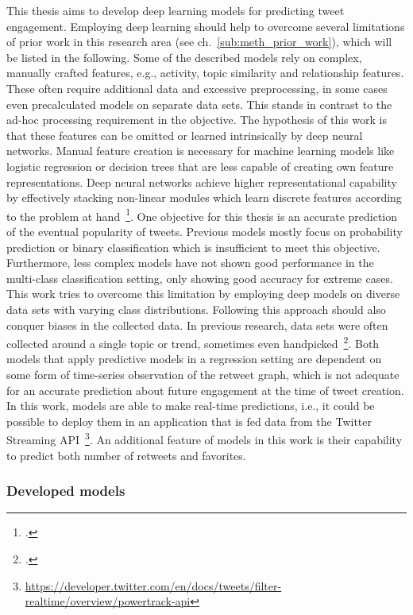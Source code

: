 This thesis aims to develop deep learning models for predicting tweet
engagement.
Employing deep learning should help to overcome several limitations of prior
work in this research area (see ch.~\ref{sub:meth_prior_work}), which will be listed in the following.
Some of the described models rely on complex, manually crafted features, e.g.,
activity, topic similarity and relationship features.
These often require additional data and excessive preprocessing, in some cases
even precalculated models on separate data sets.
This stands in contrast to the ad-hoc processing requirement in the objective.
The hypothesis of this work is that these features can be omitted or
learned intrinsically by deep neural networks.
Manual feature creation is necessary for machine learning models like logistic
regression or decision trees that are less capable of creating own feature
representations.
Deep neural networks achieve higher representational capability by effectively
stacking non-linear modules which learn discrete features according to the problem at
hand~\footcite{LeCun2015}.
One objective for this thesis is an accurate prediction of the eventual popularity
of tweets.
Previous models mostly focus on probability prediction or binary classification
which is insufficient to meet this objective.
Furthermore, less complex models have not shown good performance in the multi-class
classification setting, only showing good accuracy for extreme cases.
This work tries to overcome this limitation by employing deep models on diverse
data sets with varying class distributions.
Following this approach should also conquer biases in the collected data.
In previous research, data sets were often collected around a single topic or
trend, sometimes even handpicked~\footcite{Zaman2014}.
Both models that apply predictive models in a regression setting are dependent
on some form of time-series observation of the retweet graph, which is not adequate for
an accurate prediction about future engagement at the time of tweet creation.
In this work, models are able to make real-time predictions, i.e., it could
be possible to deploy them in an application that is fed data from the Twitter
Streaming API~\footnote{\url{https://developer.twitter.com/en/docs/tweets/filter-realtime/overview/powertrack-api}}.
An additional feature of models in this work is their capability to predict both
number of retweets and favorites.

\subsubsection{Developed models}

